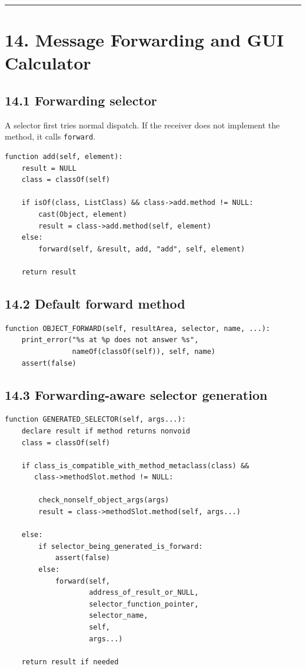 \documentclass[11pt]{article}
\begin{document}
\begin{center}\rule{0.5\linewidth}{0.5pt}\end{center}

\section{14. Message Forwarding and GUI
Calculator}\label{message-forwarding-and-gui-calculator}

\subsection{14.1 Forwarding selector}\label{forwarding-selector}

A selector first tries normal dispatch. If the receiver does not
implement the method, it calls \texttt{forward}.

\begin{verbatim}
function add(self, element):
    result = NULL
    class = classOf(self)

    if isOf(class, ListClass) && class->add.method != NULL:
        cast(Object, element)
        result = class->add.method(self, element)
    else:
        forward(self, &result, add, "add", self, element)

    return result
\end{verbatim}

\subsection{14.2 Default forward method}\label{default-forward-method}

\begin{verbatim}
function OBJECT_FORWARD(self, resultArea, selector, name, ...):
    print_error("%s at %p does not answer %s",
                nameOf(classOf(self)), self, name)
    assert(false)
\end{verbatim}

\subsection{14.3 Forwarding-aware selector
generation}\label{forwarding-aware-selector-generation}

\begin{verbatim}
function GENERATED_SELECTOR(self, args...):
    declare result if method returns nonvoid
    class = classOf(self)

    if class_is_compatible_with_method_metaclass(class) &&
       class->methodSlot.method != NULL:

        check_nonself_object_args(args)
        result = class->methodSlot.method(self, args...)

    else:
        if selector_being_generated_is_forward:
            assert(false)
        else:
            forward(self,
                    address_of_result_or_NULL,
                    selector_function_pointer,
                    selector_name,
                    self,
                    args...)

    return result if needed
\end{verbatim}
\end{document}
